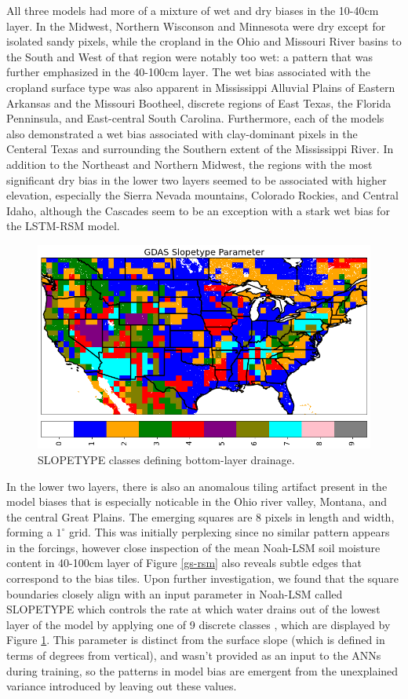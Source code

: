 All three models had more of a mixture of wet and dry biases in the 10-40cm layer. In the Midwest, Northern Wisconson and Minnesota were dry except for isolated sandy pixels, while the cropland in the Ohio and Missouri River basins to the South and West of that region were notably too wet: a pattern that was further emphasized in the 40-100cm layer. The wet bias associated with the cropland surface type was also apparent in Mississippi Alluvial Plains of Eastern Arkansas and the Missouri Bootheel, discrete regions of East Texas, the Florida Penninsula, and East-central South Carolina. Furthermore, each of the models also demonstrated a wet bias associated with clay-dominant pixels in the Centeral Texas and surrounding the Southern extent of the Mississippi River. In addition to the Northeast and Northern Midwest, the regions with the most significant dry bias in the lower two layers seemed to be associated with higher elevation, especially the Sierra Nevada mountains, Colorado Rockies, and Central Idaho, although the Cascades seem to be an exception with a stark wet bias for the LSTM-RSM model.

\begin{figure}[h!]
    \centering
    \includegraphics[width=.66\linewidth,draft=false]{figures/static_slopetype_3km.png}
    \caption{SLOPETYPE classes defining bottom-layer drainage.}
    \label{slopetype-classes}
\end{figure}

In the lower two layers, there is also an anomalous tiling artifact present in the model biases that is especially noticable in the Ohio river valley, Montana, and the central Great Plains. The emerging squares are 8 pixels in length and width, forming a $1^\circ$ grid. This was initially perplexing since no similar pattern appears in the forcings, however close inspection of the mean Noah-LSM soil moisture content in 40-100cm layer of Figure \ref{gs-rsm} also reveals subtle edges that correspond to the bias tiles. Upon further investigation, we found that the square boundaries closely align with an input parameter in Noah-LSM called SLOPETYPE which controls the rate at which water drains out of the lowest layer of the model by applying one of 9 discrete classes \citep{mitchell_community_2005}, which are displayed by Figure \ref{slopetype-classes}. This parameter is distinct from the surface slope (which is defined in terms of degrees from vertical), and wasn't provided as an input to the ANNs during training, so the patterns in model bias are emergent from the unexplained variance introduced by leaving out these values.

